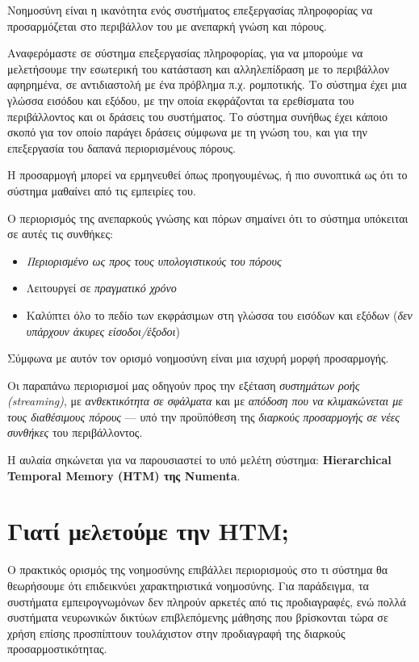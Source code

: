   \begin{displayquote}
    Νοημοσύνη είναι η ικανότητα ενός συστήματος επεξεργασίας πληροφορίας να προσαρμόζεται
    στο περιβάλλον του με ανεπαρκή γνώση και πόρους.
  \end{displayquote}

  Αναφερόμαστε σε σύστημα επεξεργασίας πληροφορίας, για να μπορούμε να μελετήσουμε την εσωτερική του κατάσταση και αλληλεπίδραση
  με το περιβάλλον αφηρημένα, σε αντιδιαστολή με ένα πρόβλημα π.χ. ρομποτικής.
  Το σύστημα έχει μια γλώσσα εισόδου και εξόδου, με την οποία εκφράζονται τα ερεθίσματα του περιβάλλοντος και οι δράσεις του συστήματος.
  Το σύστημα συνήθως έχει κάποιο σκοπό για τον οποίο παράγει δράσεις σύμφωνα με τη γνώση του,
  και για την επεξεργασία του δαπανά περιορισμένους πόρους.

  Η προσαρμογή μπορεί να ερμηνευθεί όπως προηγουμένως, ή πιο συνοπτικά ως ότι το σύστημα μαθαίνει από τις εμπειρίες του.

  Ο περιορισμός της ανεπαρκούς γνώσης και πόρων σημαίνει ότι το σύστημα υπόκειται σε αυτές τις συνθήκες:
  \begin{itemize}
    \item \textit{Περιορισμένο ως προς τους υπολογιστικούς του πόρους}
    \item Λειτουργεί σε \textit{πραγματικό χρόνο}
    \item Καλύπτει όλο το πεδίο των εκφράσιμων στη γλώσσα του εισόδων και εξόδων (\textit{δεν υπάρχουν άκυρες είσοδοι/έξοδοι})
  \end{itemize}

  Σύμφωνα με αυτόν τον ορισμό νοημοσύνη είναι μια ισχυρή μορφή προσαρμογής.

  Οι παραπάνω περιορισμοί μας οδηγούν προς την εξέταση \textit{συστημάτων ροής (streaming)}, με \textit{ανθεκτικότητα σε σφάλματα}
  και με \textit{απόδοση που να κλιμακώνεται με τους διαθέσιμους πόρους} --- υπό την προϋπόθεση της \textit{διαρκούς προσαρμογής σε νέες συνθήκες} του περιβάλλοντος.

  Η αυλαία σηκώνεται για να παρουσιαστεί το υπό μελέτη σύστημα: \textbf{Hierarchical Temporal Memory (HTM) της Numenta}.

\section{Γιατί μελετούμε την HTM;}

  Ο πρακτικός ορισμός της νοημοσύνης επιβάλλει περιορισμούς στο τι σύστημα θα θεωρήσουμε ότι επιδεικνύει χαρακτηριστικά νοημοσύνης.
  Για παράδειγμα, τα συστήματα εμπειρογνωμόνων δεν πληρούν αρκετές από τις προδιαγραφές, ενώ πολλά συστήματα νευρωνικών
  δικτύων επιβλεπόμενης μάθησης που βρίσκονται τώρα σε χρήση επίσης προσπίπτουν τουλάχιστον στην προδιαγραφή της διαρκούς προσαρμοστικότητας.


